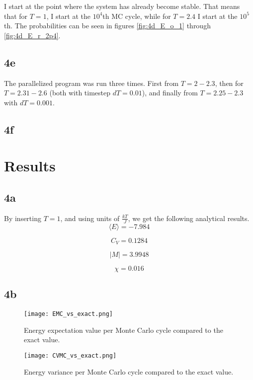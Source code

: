 \documentclass[10pt,showpacs,preprintnumbers,footinbib,amsmath,amssymb,aps,prl,twocolumn,groupedaddress,superscriptaddress,showkeys]{revtex4-1}
\begin{document}
I start at the point where the system has already become stable. That means that for $T = 1$, I start at the $10^4$th MC cycle, while for $T = 2.4$ I start at the $10^5$th. The probabilities can be seen in figures \ref{fig:4d_E_o_1} through \ref{fig:4d_E_r_2p4}.

\subsection*{4e}

The parallelized program was run three times. First from $T = 2 - 2.3$, then for $T = 2.31-2.6$ (both with timestep $dT = 0.01$), and finally from $T = 2.25-2.3$ with $dT = 0.001$.

\subsection*{4f}

\section{Results}

\subsection*{4a}

By inserting $T = 1$, and using units of $\frac{k T}{J}$, we get the following analytical results. 
$$
\langle E \rangle = -7.984
$$

$$
C_V = 0.1284
$$

$$
|M| = 3.9948
$$

$$
\chi = 0.016
$$

\subsection*{4b}

\begin{figure}
	\centering
	\texttt{[image: EMC\_vs\_exact.png]}
	\caption{Energy expectation value per Monte Carlo cycle compared to the exact value.}
	\label{fig:4b_E_exact}
\end{figure}

\begin{figure}
	\centering
	\texttt{[image: CVMC\_vs\_exact.png]}
	\caption{Energy variance per Monte Carlo cycle compared to the exact value.}
	\label{fig:4b_CV_exact}
\end{figure}
\end{document}
